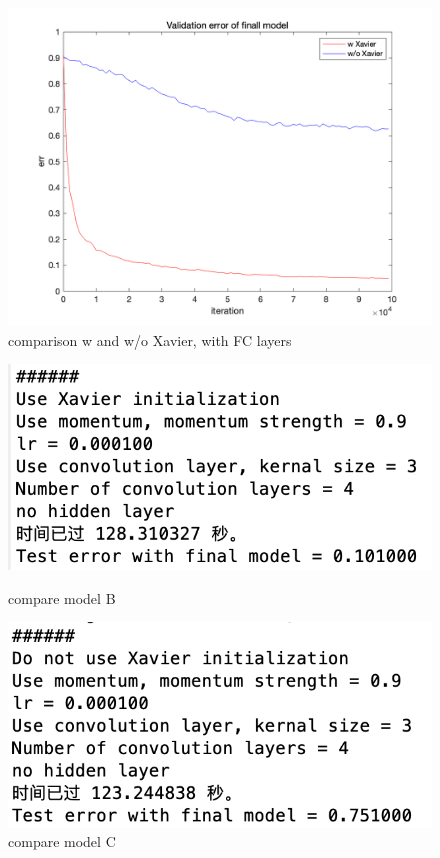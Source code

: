 \documentclass[10pt]{article}
\begin{document}
\begin{figure}[htbp]
  \centering
  \includegraphics[width=0.8\linewidth]{figures/final-plot-1.png}
  \caption{comparison w and w/o Xavier, with FC layers}
  \label{fig:final-plot-1}
\end{figure}

\begin{figure}[htbp]
  \centering
  \begin{minipage}{0.48\linewidth}
    \centering
    \includegraphics[width=\linewidth]{figures/final-3.png}
    \caption{compare model B}
    \label{fig:final-3}
  \end{minipage}
  \begin{minipage}{0.48\linewidth}
    \centering
    \includegraphics[width=\linewidth]{figures/final-4.png}
    \caption{compare model C}
    \label{fig:final-4}
  \end{minipage}
\end{figure}
\end{document}
